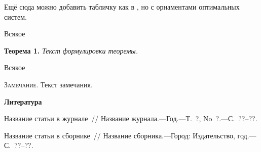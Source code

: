 









Ещё сюда можно добавить табличку как в \cite{our-mz-rus},
но с орнаментами оптимальных систем.

\printbibliography




%
\begin{theorem}
	Всякое
\end{theorem}


 \textbf{Теорема 1.} \textsl{Текст формулировки теоремы.}
%
%
%
%
%

\begin{remark*}
	Всякое
\end{remark*}


\textsc{Замечание.} Текст замечания.
%
%
%
%
%
%
%
%

\par\bigskip\centerline{\bf Литература}\smallskip

 \begin{enumerate}

 \itemsep=0pt\parskip=0pt



 {Название статьи в
журнале~/\!/ Название журнала.---Год.---Т.~?, No~?.---С.~??--??.}

{Название статьи в сборнике~/\!/ Название сборника.---Город:
Издательство, год.---С.~??--??.}

 \end{enumerate}





